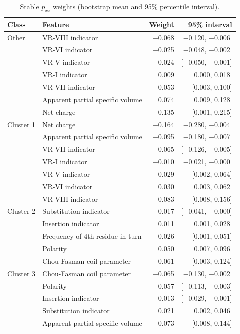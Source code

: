 \documentclass[11pt]{article}
\begin{document}
\begin{table}[H]
\centering
\caption{Stable $p_{xz}$ weights (bootstrap mean and 95\% percentile interval).}
\label{tab:pxz}
\small
\begin{tabular}{llrr}
\toprule
Class & Feature & Weight & 95\% interval \\
\midrule
Other & VR-VIII indicator & $-$0.068 & [$-$0.120, $-$0.006] \\
 & VR-VI indicator & $-$0.025 & [$-$0.048, $-$0.002] \\
 & VR-V indicator & $-$0.024 & [$-$0.050, $-$0.001] \\
 & VR-I indicator & 0.009 & [0.000, 0.018] \\
 & VR-VII indicator & 0.053 & [0.003, 0.100] \\
 & Apparent partial specific volume & 0.074 & [0.009, 0.128] \\
 & Net charge & 0.135 & [0.001, 0.215] \\
\midrule
Cluster 1 & Net charge & $-$0.164 & [$-$0.280, $-$0.004] \\
 & Apparent partial specific volume & $-$0.095 & [$-$0.180, $-$0.007] \\
 & VR-VII indicator & $-$0.065 & [$-$0.126, $-$0.005] \\
 & VR-I indicator & $-$0.010 & [$-$0.021, $-$0.000] \\
 & VR-V indicator & 0.029 & [0.002, 0.064] \\
 & VR-VI indicator & 0.030 & [0.003, 0.062] \\
 & VR-VIII indicator & 0.083 & [0.008, 0.156] \\
\midrule
Cluster 2 & Substitution indicator & $-$0.017 & [$-$0.041, $-$0.000] \\
 & Insertion indicator & 0.011 & [0.001, 0.028] \\
 & Frequency of 4th residue in turn & 0.026 & [0.001, 0.051] \\
 & Polarity & 0.050 & [0.007, 0.096] \\
 & Chou-Fasman coil parameter & 0.061 & [0.003, 0.124] \\
\midrule
Cluster 3 & Chou-Fasman coil parameter & $-$0.065 & [$-$0.130, $-$0.002] \\
 & Polarity & $-$0.057 & [$-$0.113, $-$0.003] \\
 & Insertion indicator & $-$0.013 & [$-$0.029, $-$0.001] \\
 & Substitution indicator & 0.021 & [0.002, 0.046] \\
 & Apparent partial specific volume & 0.073 & [0.008, 0.144] \\
\bottomrule
\end{tabular}
\end{table}
\end{document}
